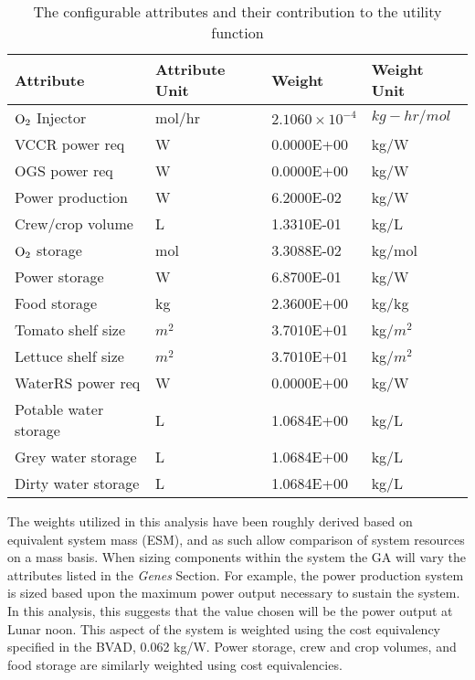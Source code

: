 \documentclass[submit]{aiaa}
\begin{document}
\begin{table}
\begin{center}
\begin{tabular}{|l|l|l|l|}  \hline
Attribute & Attribute Unit & Weight & Weight Unit\\ \hline\hline
${\rm O}_2$ Injector & mol/hr & $2.1060 \times 10^{-4}$ & $kg-hr/mol$ \\ \hline
VCCR power req & W & 0.0000E+00 & kg/W \\ \hline
OGS power req & W & 0.0000E+00 & kg/W \\ \hline
Power production & W & 6.2000E-02 & kg/W \\ \hline
Crew/crop volume & L & 1.3310E-01 & kg/L \\ \hline
${\rm O}_2$ storage & mol & 3.3088E-02 & kg/mol \\ \hline
Power storage & W & 6.8700E-01 & kg/W \\ \hline
Food storage & kg & 2.3600E+00 & kg/kg \\ \hline
Tomato shelf size & $m^2$ & 3.7010E+01 & kg/$m^2$ \\ \hline
Lettuce shelf size & $m^2$ & 3.7010E+01 & kg/$m^2$ \\ \hline
WaterRS power req & W & 0.0000E+00 & kg/W \\ \hline
Potable water storage & L & 1.0684E+00 & kg/L \\ \hline
Grey water storage & L & 1.0684E+00 & kg/L \\ \hline
Dirty water storage & L & 1.0684E+00 & kg/L \\ \hline
\end{tabular}
\end{center}
\caption{The configurable attributes and their contribution to the
  utility function} 
\label{tab:weights}
\end{table}

The weights utilized in this analysis have been roughly derived based on equivalent system mass (ESM), and as such allow comparison of system resources on a mass basis.
When sizing components within the system the GA will vary the
attributes listed in the \emph{Genes} Section.
For example, the power
production system is sized based upon the maximum power output
necessary to sustain the system. In this analysis, this suggests that
the value chosen will be the power output at Lunar noon. This aspect
of the system is weighted using the cost equivalency specified in the
BVAD, 0.062 kg/W\cite{bvad04}. 
Power storage, crew and crop volumes, and food storage are similarly
weighted using cost equivalencies\cite{bvad04}.
\end{document}
